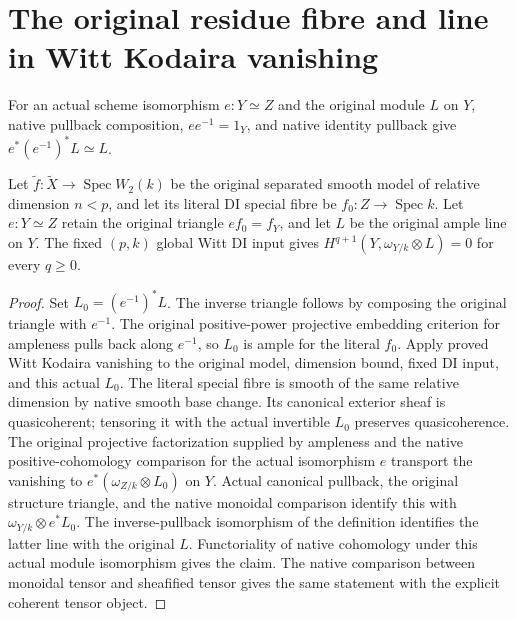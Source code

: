 \section{The original residue fibre and line in Witt Kodaira vanishing}

\begin{definition}\label{def:kn-inverse-pullback-line}
\leanok
For an actual scheme isomorphism $e:Y\simeq Z$ and the original module $L$
on $Y$, native pullback composition, $e e^{-1}=1_Y$, and native identity
pullback give $e^*(e^{-1})^*L\simeq L$.
\end{definition}

\begin{lemma}\label{lem:kn-witt-original-fibre-kodaira}
\leanok
{}
Let $\widetilde f:\widetilde X\to\operatorname{Spec}W_2(k)$ be the original
separated smooth model of relative dimension $n<p$, and let its literal DI
special fibre be $f_0:Z\to\operatorname{Spec}k$. Let $e:Y\simeq Z$ retain
the original triangle $e f_0=f_Y$, and let $L$ be the original ample line on
$Y$. The fixed $(p,k)$ global Witt DI input gives
$H^{q+1}(Y,\omega_{Y/k}\otimes L)=0$ for every $q\geq0$.
\end{lemma}
\begin{proof}
Set $L_0=(e^{-1})^*L$. The inverse triangle follows by composing the
original triangle with $e^{-1}$. The original positive-power projective
embedding criterion for ampleness pulls back along $e^{-1}$, so $L_0$ is
ample for the literal $f_0$. Apply proved Witt Kodaira vanishing to the
original model, dimension bound, fixed DI input, and this actual $L_0$.
The literal special fibre is smooth of the same relative dimension by
native smooth base change. Its canonical exterior sheaf is quasicoherent;
tensoring it with the actual invertible $L_0$ preserves quasicoherence.
The original projective factorization supplied by ampleness and the native
positive-cohomology comparison for the actual isomorphism $e$ transport the
vanishing to $e^*(\omega_{Z/k}\otimes L_0)$ on $Y$. Actual canonical pullback,
the original structure triangle, and the native monoidal comparison identify
this with $\omega_{Y/k}\otimes e^*L_0$. The inverse-pullback isomorphism of
the definition identifies the latter line with the original $L$. Functoriality
of native cohomology under this actual module isomorphism gives the claim.
The native comparison between monoidal tensor and sheafified tensor gives
the same statement with the explicit coherent tensor object.
\end{proof}

